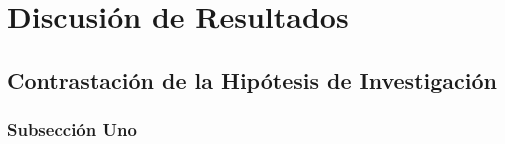 \chapter{Discusión de Resultados}
\label{discusion}

\lipsum[1-1]

\section{Contrastación de la Hipótesis de Investigación}
\lipsum[1-1]

\subsection{Subsección Uno}

\lipsum[5-5]